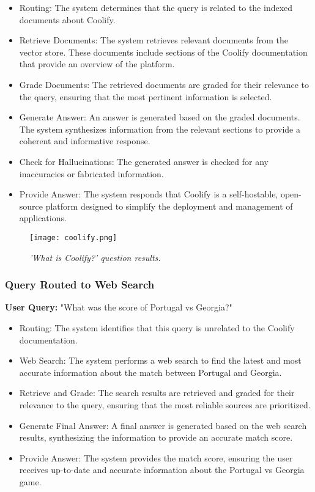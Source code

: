 \begin{itemize}
    \item Routing: The system determines that the query is related to the indexed documents about Coolify.
    \item Retrieve Documents: The system retrieves relevant documents from the vector store. These documents include sections of the Coolify documentation that provide an overview of the platform.
    \item Grade Documents: The retrieved documents are graded for their relevance to the query, ensuring that the most pertinent information is selected.
    \item Generate Answer: An answer is generated based on the graded documents. The system synthesizes information from the relevant sections to provide a coherent and informative response.
    \item Check for Hallucinations: The generated answer is checked for any inaccuracies or fabricated information.
    \item Provide Answer: The system responds that Coolify is a self-hostable, open-source platform designed to simplify the deployment and management of applications.
\end{itemize}

\begin{figure}[H]
    \centering
    \texttt{[image: coolify.png]}
    \caption{
        \it{'What is Coolify?' question results.}
    }
\end{figure}

\subsubsection*{Query Routed to Web Search}

\textbf{User Query:} "What was the score of Portugal vs Georgia?"

\begin{itemize}
    \item Routing: The system identifies that this query is unrelated to the Coolify documentation.
    \item Web Search: The system performs a web search to find the latest and most accurate information about the match between Portugal and Georgia.
    \item Retrieve and Grade: The search results are retrieved and graded for their relevance to the query, ensuring that the most reliable sources are prioritized.
    \item Generate Final Answer: A final answer is generated based on the web search results, synthesizing the information to provide an accurate match score.
    \item Provide Answer: The system provides the match score, ensuring the user receives up-to-date and accurate information about the Portugal vs Georgia game.
\end{itemize}


